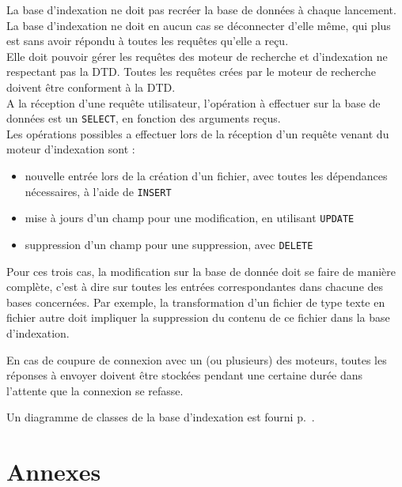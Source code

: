 \documentclass[a4paper,12pt]{report}
\begin{document}
La base d'indexation ne doit pas recréer la base de données à chaque lancement.\\
La base d'indexation ne doit en aucun cas se déconnecter d'elle même, qui plus est sans avoir répondu à toutes les requêtes qu'elle a reçu.\\
Elle doit pouvoir gérer les requêtes des moteur de recherche et d'indexation ne respectant pas la DTD. Toutes les requêtes crées par le moteur de recherche doivent être conforment à la DTD.\\
A la réception d'une requête utilisateur, l'opération à effectuer sur la base de données est un \verb"SELECT", en fonction des arguments reçus.\\
Les opérations possibles a effectuer lors de la réception d'un requête venant du moteur d'indexation sont :
\begin{itemize}
\item nouvelle entrée lors de la création d'un fichier, avec toutes les dépendances nécessaires, à l'aide de \verb"INSERT"
\item mise à jours d'un champ pour une modification, en utilisant \verb"UPDATE"
\item suppression d'un champ pour une suppression, avec \verb"DELETE"
\end{itemize}
Pour ces trois cas, la modification sur la base de donnée doit se faire de manière complète, c'est à dire sur toutes les entrées correspondantes dans chacune des bases concernées. Par exemple, la transformation d'un fichier de type texte en fichier autre doit impliquer la suppression du contenu de ce fichier dans la base d'indexation.

En cas de coupure de connexion avec un (ou plusieurs) des moteurs, toutes les réponses à envoyer doivent être stockées pendant une certaine durée dans l'attente que la connexion se refasse.

Un diagramme de classes de la base d'indexation est fourni p.~\pageref{diagramme_classes_bi}.

\chapter{Annexes}
\end{document}
